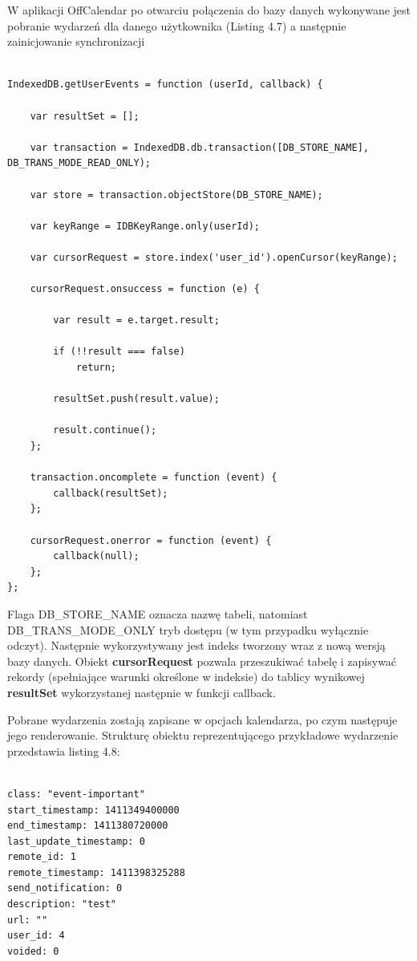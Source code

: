 W aplikacji OffCalendar po otwarciu połączenia do bazy danych wykonywane jest pobranie wydarzeń dla danego użytkownika (Listing 4.7) a następnie zainicjowanie synchronizacji

\begin{lstlisting}[caption=Pobranie wydarzeń użytkownika., label=amb, captionpos=b]

IndexedDB.getUserEvents = function (userId, callback) {

    var resultSet = [];

    var transaction = IndexedDB.db.transaction([DB_STORE_NAME], DB_TRANS_MODE_READ_ONLY);

    var store = transaction.objectStore(DB_STORE_NAME);

    var keyRange = IDBKeyRange.only(userId);

    var cursorRequest = store.index('user_id').openCursor(keyRange);

    cursorRequest.onsuccess = function (e) {

        var result = e.target.result;

        if (!!result === false)
            return;

        resultSet.push(result.value);

        result.continue();
    };

    transaction.oncomplete = function (event) {
        callback(resultSet);
    };

    cursorRequest.onerror = function (event) {
        callback(null);
    };
};

\end{lstlisting}

Flaga DB\_STORE\_NAME oznacza nazwę tabeli, natomiast DB\_TRANS\_MODE\_ONLY tryb dostępu (w tym przypadku wyłącznie odczyt). Następnie wykorzystywany jest indeks tworzony wraz z nową wersją bazy danych. Obiekt \textbf{cursorRequest} pozwala przeszukiwać tabelę i zapisywać rekordy (spełniające warunki określone w indeksie) do tablicy wynikowej \textbf{resultSet} wykorzystanej następnie w funkcji callback.

Pobrane wydarzenia zostają zapisane w opcjach kalendarza, po czym następuje jego renderowanie. Strukturę obiektu reprezentującego przykładowe wydarzenie przedstawia listing 4.8:

\begin{lstlisting}[caption=Struktura obiektu reprezentującego wydarzenie., label=amb, captionpos=b]

class: "event-important"
start_timestamp: 1411349400000
end_timestamp: 1411380720000
last_update_timestamp: 0
remote_id: 1
remote_timestamp: 1411398325288
send_notification: 0
description: "test"
url: ""
user_id: 4
voided: 0

\end{lstlisting}

